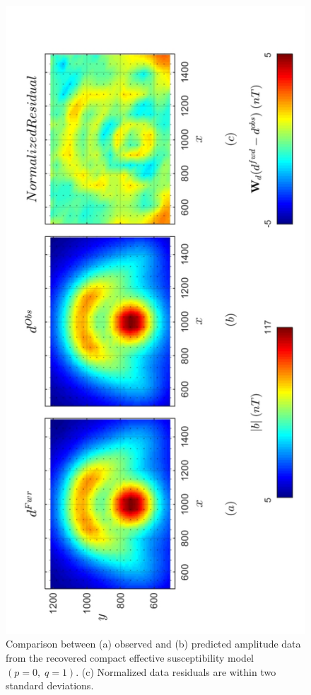 \begin{figure}[h!]
\centering
\includegraphics[scale=0.52, angle =270]{3D_Inv_l0l1_CMI_pred_kEff.pdf}
\caption{Comparison between (a) observed and (b) predicted amplitude data from the recovered compact effective susceptibility model $(p = 0,\; q = 1)$. (c) Normalized data residuals are within two standard deviations.}
\label{fig:3D_Inv_l0l1_CMI_pred_kEff}
\end{figure}

